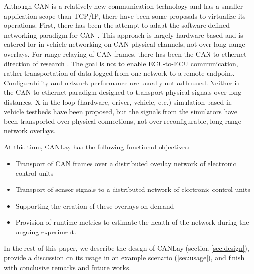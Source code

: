 \documentclass[letterpaper,twocolumn,12pt]{article}
\begin{document}
Although CAN is a relatively new communication technology and has a smaller application scope than TCP/IP, there have been some proposals to virtualize its operations. 
First, there has been the attempt to adapt the software-defined networking paradigm for CAN \cite{rotermund_requirements_2020,doering_retrofitting_nodate,grewe_bloomycan_2021}. This approach is largely hardware-based and is catered for in-vehicle networking on CAN physical channels, not over long-range overlays. For range relaying of CAN frames, there has been the CAN-to-ethernet direction of research \cite{johanson_relaying_2009,florian_polzlbauer_experience_2019}. The goal is not to enable ECU-to-ECU communication, rather transportation of data logged from one network to a remote endpoint. Configurability and network performance are usually not addressed. Neither is the CAN-to-ethernet paradigm designed to transport physical signals over long distances. 
X-in-the-loop (hardware, driver, vehicle, etc.) simulation-based in-vehicle testbeds \cite{appel_safety_2020} have been proposed, but the signals from the simulators have been transported over physical connections, not over reconfigurable, long-range network overlays. 

At this time, CANLay has the following functional objectives:
\begin{itemize}
    \item Transport of CAN frames over a distributed overlay network of electronic control units
    \item Transport of sensor signals to a distributed network of electronic control units
    \item Supporting the creation of these overlays on-demand
    \item Provision of runtime metrics to estimate the health of the network during the ongoing experiment.
\end{itemize}
In the rest of this paper, we describe the design of CANLay (section \ref{sec:design}), provide a discussion on its usage in an example scenario (\ref{sec:usage}), and finish with conclusive remarks and future works.
\end{document}
